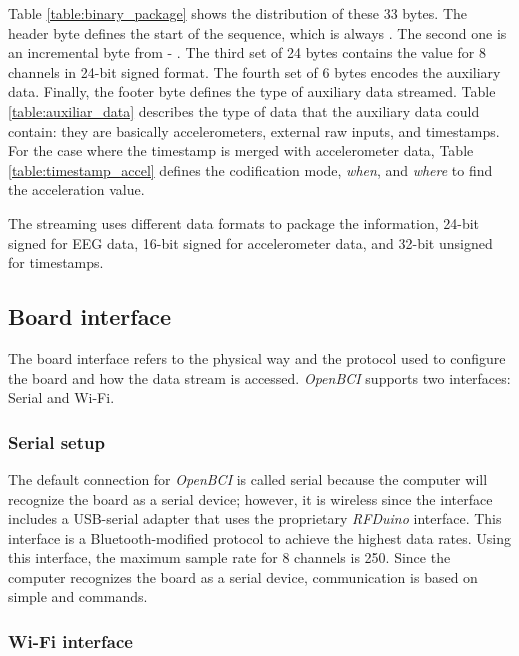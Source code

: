 Table \ref{table:binary_package} shows the distribution of these 33 bytes. The header byte defines the start of the sequence, which is always . The second one is an incremental byte from  - . The third set of 24 bytes contains the value for 8 channels in 24-bit signed format. The fourth set of 6 bytes encodes the auxiliary data. Finally, the footer byte defines the type of auxiliary data streamed. Table \ref{table:auxiliar_data} describes the type of data that the auxiliary data could contain: they are basically accelerometers, external raw inputs, and timestamps. For the case where the timestamp is merged with accelerometer data, Table \ref{table:timestamp_accel} defines the codification mode, \textit{when}, and \textit{where} to find the acceleration value.

The streaming uses different data formats to package the information, 24-bit signed for \gls*{EEG} data, 16-bit signed for accelerometer data, and 32-bit unsigned for timestamps.

\subsection{Board interface}

The board interface refers to the physical way and the protocol used to configure the board and how the data stream is accessed. \textit{OpenBCI} supports two interfaces: Serial and Wi-Fi.

\subsubsection{Serial setup}

The default connection for \textit{OpenBCI} is called serial because the computer will recognize the board as a serial device; however, it is wireless since the interface includes a USB-serial adapter that uses the proprietary \textit{RFDuino} interface. This interface is a Bluetooth-modified protocol to achieve the highest data rates. Using this interface, the maximum sample rate for 8 channels is 250. Since the computer recognizes the board as a serial device, communication is based on simple  and  commands.

\subsubsection{Wi-Fi interface}

